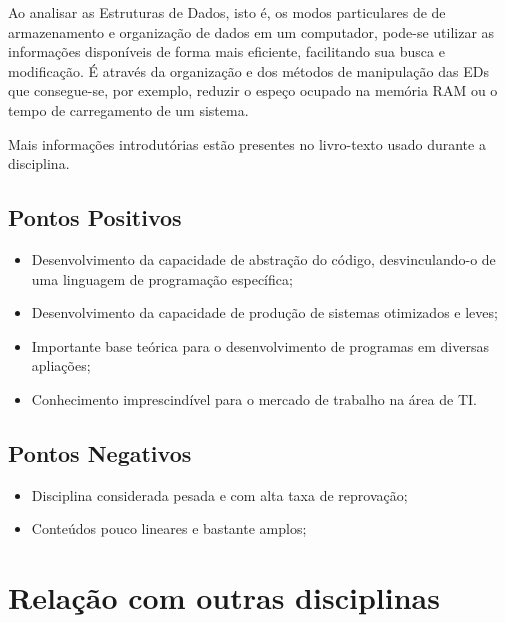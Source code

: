 \documentclass[a4paper]{article}
\begin{document}
Ao analisar as Estruturas de Dados, isto é, os modos particulares de de armazenamento e organização de dados em um computador, pode-se utilizar as informações disponíveis de forma mais eficiente, facilitando sua busca e modificação. É através da organização e dos métodos de manipulação das EDs que consegue-se, por exemplo, reduzir o espeço ocupado na memória RAM ou o tempo de carregamento de um sistema.

Mais informações introdutórias estão presentes no livro-texto usado durante a disciplina. \cite{livro}

\subsection{Pontos Positivos}
\begin{itemize}
	\item Desenvolvimento da capacidade de abstração do código, desvinculando-o de uma linguagem de programação específica;
	\item Desenvolvimento da capacidade de produção de sistemas otimizados e leves;
    \item Importante base teórica para o desenvolvimento de programas em diversas apliações;
    \item Conhecimento imprescindível para o mercado de trabalho na área de TI.
\end{itemize}

\subsection{Pontos Negativos}
\begin{itemize}
	\item Disciplina considerada pesada e com alta taxa de reprovação;
    \item Conteúdos pouco lineares e bastante amplos;
\end{itemize}

\section{Relação com outras disciplinas}
\end{document}

